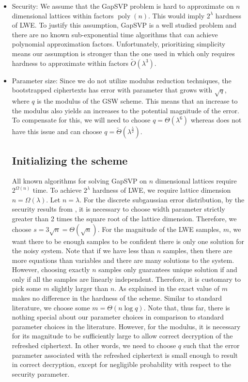 \begin{itemize}

    \item Security: We assume that the GapSVP problem is hard to approximate on $n$ dimensional lattices within factors $\operatorname{poly}(n)$. This would imply $2^\lambda$ hardness of LWE. To justify this assumption, GapSVP is a well studied problem and there are no known sub-exponential time algorithms that can achieve polynomial approximation factors. Unfortunately, prioritizing simplicity means our assumption is stronger than the one used in \cite{A-S-P-boot} which only requires hardness to approximate within factors $\tilde{O}(\lambda^3)$.
    \item Parameter size: Since we do not utilize modulus reduction techniques, the bootstrapped ciphertexts has error with parameter that grows with $\sqrt{q}$, where $q$ is the modulus of the GSW scheme. This means that an increase to the modulus also yields an increases to the potential magnitude of the error. To compensate for this, we will need to choose $q = \Theta(\lambda^6)$ whereas \cite{A-S-P-boot} does not have this issue and can choose $q = \tilde{\Theta}(\lambda^\frac{5}{2})$.
\subsection*{Initializing the scheme}
All known algorithms for solving GapSVP on $n$ dimensional lattices require $2^{\Omega(n)}$ time. To achieve $2^\lambda$ hardness of LWE, we require lattice dimension $n = \Omega(\lambda)$. Let $n = \lambda$. For the discrete subgaussian error distribution, by the security results from \cite{Reg05-LWE}, it is necessary to choose width parameter strictly greater than 2 times the square root of the lattice dimension. Therefore, we choose $s = 3\sqrt{n} = \Theta(\sqrt{n})$. For the magnitude of the LWE samples, $m$, we want there to be enough samples to be confident there is only one solution for the noisy system. Note that if we have less than $n$ samples, then there are more equations than variables and there are many solutions to the system. However, choosing exactly $n$ samples only guarantees unique solution if and only if all the samples are linearly independent. Therefore, it is customary to pick some $m$ slightly larger than $n$. As explained in \cite{Pei16-decade} the exact value of $m$ makes no difference in the hardness of the scheme. Similar to standard literature, we choose some $m = \Theta(n\log q)$. Note that, thus far, there is nothing special about our parameter choices in comparison to standard parameter choices in the literature. However, for the modulus, it is necessary for its magnitude to be sufficiently large to allow correct decryption of the refreshed ciphertext. In other words, we need to choose $q$ such that the error parameter associated with the refreshed ciphertext is small enough to result in correct decryption, except for negligible probability with respect to the security parameter.

\end{itemize}
